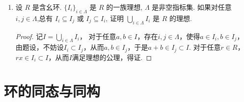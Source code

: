 \begin{enumerate}
\item 设 $R$ 是含幺环. $\{I_i\}_{i \in \varLambda}$ 是 $R$ 的一族理想, $\varLambda$ 是非空指标集.
如果对任意 $i, j \in \varLambda$,总有 $I_i \subseteq I_j$ 或 $I_j \subseteq I_i$,
证明 $\bigcup\limits_{i \in \varLambda} I_i$ 是 $R$ 的理想.
\begin{proof}
    记$I=\bigcup\limits_{i \in \varLambda} I_i$，
    对于任意$a,b\in I$，存在$i,j\in \varLambda$，使得$a\in I_i,b\in I_j$，
    由题设，不妨设$I_i\subset I_j$，从而$a,b\in I_j$，于是$a+b\in I_j\subset I$.
    对于任意$r\in R$，$rx\in I_i\subset I$，从而$I$满足理想的公理，得证.
\end{proof}
\end{enumerate}

\section{环的同态与同构}

